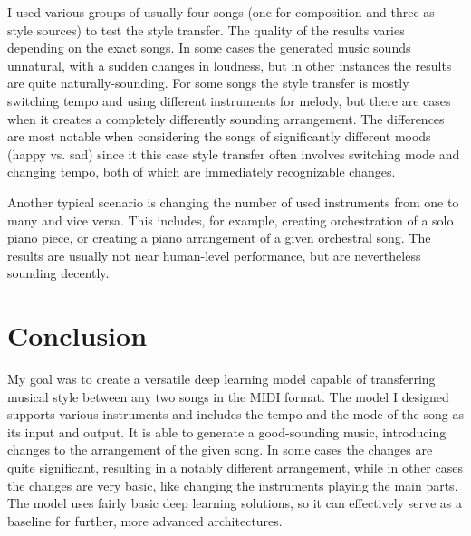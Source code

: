 \documentclass[en]{pracamgr}
\begin{document}
I used various groups of usually four songs (one for composition and three as style sources) to test the style transfer.
The quality of the results varies depending on the exact songs.
In some cases the generated music sounds unnatural, with a sudden changes in loudness, but in other instances the results are quite naturally-sounding.
For some songs the style transfer is mostly switching tempo and using different instruments for melody, but there are cases when it creates a completely differently sounding arrangement.
The differences are most notable when considering the songs of significantly different moods (happy vs. sad) since it this case style transfer often involves switching mode and changing tempo, both of which are immediately recognizable changes.

Another typical scenario is changing the number of used instruments from one to many and vice versa. This includes, for example, creating orchestration of a solo piano piece, or creating a piano arrangement of a given orchestral song.
The results are usually not near human-level performance, but are nevertheless sounding decently.

\chapter{Conclusion}

My goal was to create a versatile deep learning model capable of transferring musical style between any two songs in the MIDI format.
The model I designed supports various instruments and includes the tempo and the mode of the song as its input and output.
It is able to generate a good-sounding music, introducing changes to the arrangement of the given song.
In some cases the changes are quite significant, resulting in a notably different arrangement, while in other cases the changes are very basic, like changing the instruments playing the main parts.
The model uses fairly basic deep learning solutions, so it can effectively serve as a baseline for further, more advanced architectures.
\end{document}
